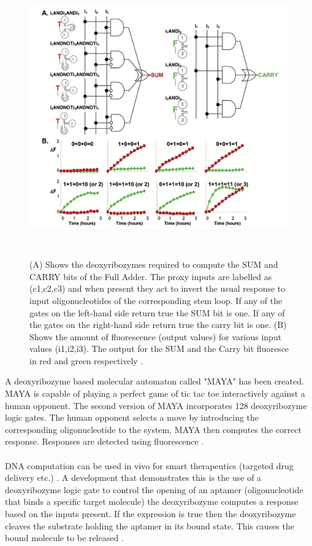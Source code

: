 \documentclass[11pt,a4paper,portrait]{article}
\begin{document}
\begin{figure}[ht!]
\centering
\includegraphics[width=120mm, height=120mm]{fulladder.png}
\caption{(A) Shows the deoxyribozymes required to compute the SUM and CARRY bits of the Full Adder. The proxy inputs are labelled as (c1,c2,c3) and when present they act to invert the usual response to input oligonucleotides of the corresponding stem loop. If any of the gates on the left-hand side return true the SUM bit is one. If any of the gates on the right-hand side return true the carry bit is one. (B) Shows the amount of  fluorescence (output values) for various input values (i1,i2,i3). The output for the SUM and the Carry bit fluoresce in red and green respectively \cite{Lederman2006}.}
\label{fulladder}
\end{figure}

A deoxyribozyme based molecular automaton called "MAYA" has been created. MAYA is capable of playing a perfect game of tic tac toe interactively against a human opponent. The second version of MAYA incorporates 128 deoxyribozyme logic gates. The human opponent selects a move by introducing the corresponding oligonucleotide to the system, MAYA then computes the correct response. Responses are detected using fluorescence \cite{MAYA2}.
\\
\\
DNA computation can be used in vivo for smart therapeutics (targeted drug delivery etc.) \cite{Qian11}. A development that demonstrates this is the use of a deoxyribozyme logic gate to control the opening of an aptamer (oligonucleotide that binds a specific target molecule) the deoxyribozyme computes a response based on the inputs present. If the expression is true then the deoxyribozyme cleaves the substrate holding the aptamer in its bound state. This causes the bound molecule to be released \cite{Aptamer}.
\end{document}
